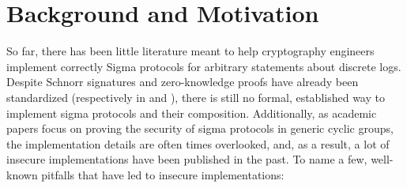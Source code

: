 \documentclass[runningheads]{llncs}
\begin{document}

\section{Background and Motivation}
\label{sec:motivation}
So far, there has been little literature meant to help cryptography engineers implement correctly Sigma protocols for arbitrary statements about discrete logs.
Despite Schnorr signatures and zero-knowledge proofs have already been standardized (respectively in \cite{rfc8032} and \cite{rfc8235}), there is still no formal, established way to implement sigma protocols and their composition.
 Additionally, as academic papers focus on proving the security of sigma protocols in generic cyclic groups, the implementation details are often times overlooked, and, as a result, a lot of insecure implementations have been published in the past. To name a few, well-known pitfalls that have led to insecure implementations:
\end{document}
